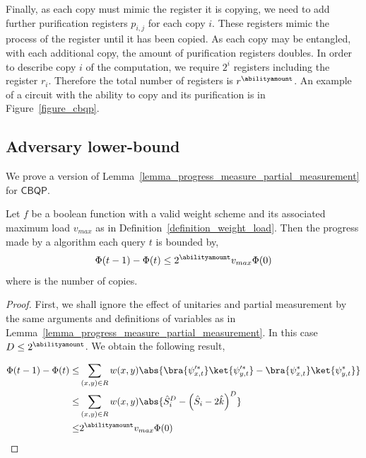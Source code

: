 Finally, as each copy must mimic the register it is copying, we need to add further purification registers $p_{i,j}$ for each copy $i$. These registers mimic the process of the register until it has been copied. As each copy may be entangled, with each additional copy, the amount of purification registers doubles. In order to describe copy $i$ of the computation, we require $2^i$ registers including the register $r_i$. Therefore the total number of registers is $r^{\abilityamount}$. An example of a circuit with the ability to copy and its purification is in Figure~\ref{figure_cbqp}.

\subsection{Adversary lower-bound}

We prove a version of Lemma~\ref{lemma_progress_measure_partial_measurement} for $\mathsf{CBQP}$.

\begin{lemma}\label{lemma_copy}
    Let $f$ be a boolean function with a valid weight scheme and its associated maximum load $v_{max}$ as in Definition~\ref{definition_weight_load}. Then the progress made by a \copybqpname algorithm each query $t$ is bounded by,
    \begin{align*}
        \Phi(t-1)-\Phi(t)\leq 2^{\abilityamount} v_{max} \Phi (0)
    \end{align*}
    where \abilityamount is the number of copies.
\end{lemma}
\begin{proof}
    First, we shall ignore the effect of unitaries and partial measurement by the same arguments and definitions of variables as in Lemma~\ref{lemma_progress_measure_partial_measurement}. In this case $D\leq 2^{\abilityamount}$. We obtain the following result,

    \begin{align}
        \Phi(t-1) - \Phi(t) \leq 
        &\sum_{(x,y)\in R} w(x,y) \abs{ \bra{\psi_{x,t}^{\prime *}}\ket{\psi_{y,t}^{\prime *}} - \bra{\psi_{x,t}^*}\ket{\psi_{y,t}^*}}\label{copy_weight_1}\\
        \leq &\sum_{(x,y)\in R} w(x,y)\abs{\hat{S}_i^D - \left(\hat{S}_i - 2\hat{k}\right)^D} \label{copy_weight_2}\\
        \leq & 2^{\abilityamount}v_{max}\Phi(0)\label{copy_weight_3}
    \end{align}
\end{proof}

